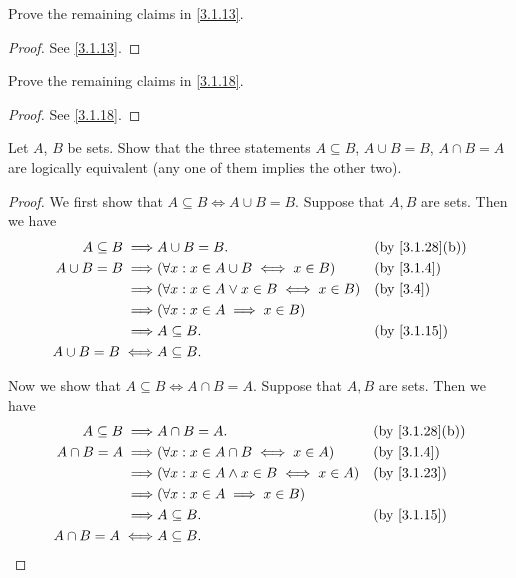 \begin{ex}\label{ex:3.1.3}
  Prove the remaining claims in \cref{3.1.13}.
\end{ex}

\begin{proof}
  See \cref{3.1.13}.
\end{proof}

\begin{ex}\label{ex:3.1.4}
  Prove the remaining claims in \cref{3.1.18}.
\end{ex}

\begin{proof}
  See \cref{3.1.18}.
\end{proof}

\begin{ex}\label{ex:3.1.5}
  Let \(A\), \(B\) be sets.
  Show that the three statements \(A \subseteq B\), \(A \cup B = B\), \(A \cap B = A\) are logically equivalent (any one of them implies the other two).
\end{ex}

\begin{proof}
  We first show that \(A \subseteq B \iff A \cup B = B\).
  Suppose that \(A, B\) are sets.
  Then we have
  \begin{align*}
    A \subseteq B \implies & A \cup B = B.                                   &  & \text{(by \cref{3.1.28}(b))} \\
    A \cup B = B \implies  & (\forall x : x \in A \cup B \iff x \in B)       &  & \text{(by \cref{3.1.4})}     \\
    \implies               & (\forall x : x \in A \lor x \in B \iff x \in B) &  & \text{(by \cref{3.4})}       \\
    \implies               & (\forall x : x \in A \implies x \in B)                                            \\
    \implies               & A \subseteq B.                                  &  & \text{(by \cref{3.1.15})}    \\
    A \cup B = B \iff      & A \subseteq B.
  \end{align*}

  Now we show that \(A \subseteq B \iff A \cap B = A\).
  Suppose that \(A, B\) are sets.
  Then we have
  \begin{align*}
    A \subseteq B \implies & A \cap B = A.                                    &  & \text{(by \cref{3.1.28}(b))} \\
    A \cap B = A \implies  & (\forall x : x \in A \cap B \iff x \in A)        &  & \text{(by \cref{3.1.4})}     \\
    \implies               & (\forall x : x \in A \land x \in B \iff x \in A) &  & \text{(by \cref{3.1.23})}    \\
    \implies               & (\forall x : x \in A \implies x \in B)                                             \\
    \implies               & A \subseteq B.                                   &  & \text{(by \cref{3.1.15})}    \\
    A \cap B = A \iff      & A \subseteq B.
  \end{align*}
\end{proof}

